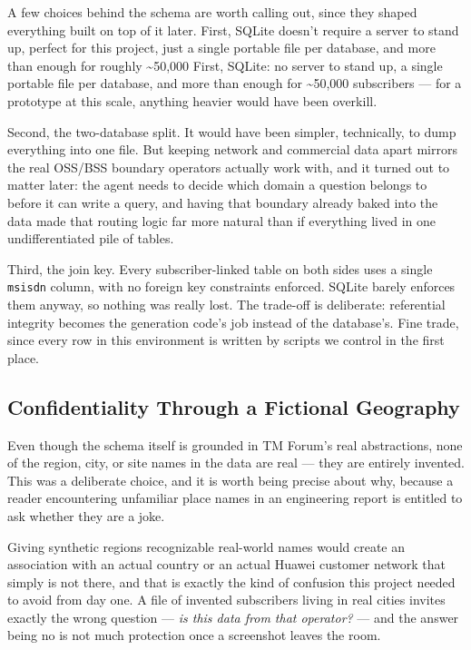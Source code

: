 A few choices behind the schema are worth calling out, since they shaped
everything built on top of it later. First, SQLite doesn't require a server
to stand up, perfect for this project, just a single portable file per
database,  and more than enough for roughly \textasciitilde50{,}000
First, SQLite: no server to stand up,
a single portable file per database, and more than enough for \textasciitilde50{,}000
subscribers — for a prototype at this scale, anything heavier would have
been overkill.

Second, the two-database split. It would have been simpler, technically,
to dump everything into one file. But keeping network and commercial data
apart mirrors the real OSS/BSS boundary operators actually work with, and
it turned out to matter later: the agent needs to decide which domain a
question belongs to before it can write a query, and having that boundary
already baked into the data made that routing logic far more natural than
if everything lived in one undifferentiated pile of tables.

Third, the join key. Every subscriber-linked table on both sides uses a
single \texttt{msisdn} column, with no foreign key constraints enforced.
SQLite barely enforces them anyway, so nothing was really lost. The
trade-off is deliberate: referential integrity becomes the generation
code's job instead of the database's. Fine trade, since every row in
this environment is written by scripts we control in the first place.


\subsection{Confidentiality Through a Fictional Geography}\label{sec:fictional-geography}

Even though the schema itself is grounded in TM Forum's real abstractions,
none of the region, city, or site names in the data are real --- they are
entirely invented. This was a deliberate choice, and it is worth being precise
about why, because a reader encountering unfamiliar place names in an
engineering report is entitled to ask whether they are a joke.

Giving synthetic regions recognizable real-world names would create an
association with an actual country or an actual Huawei customer network that
simply is not there, and that is exactly the kind of confusion this project
needed to avoid from day one. A file of invented subscribers living in real
cities invites exactly the wrong question --- \emph{is this data from that
operator?} --- and the answer being no is not much protection once a screenshot
leaves the room.

